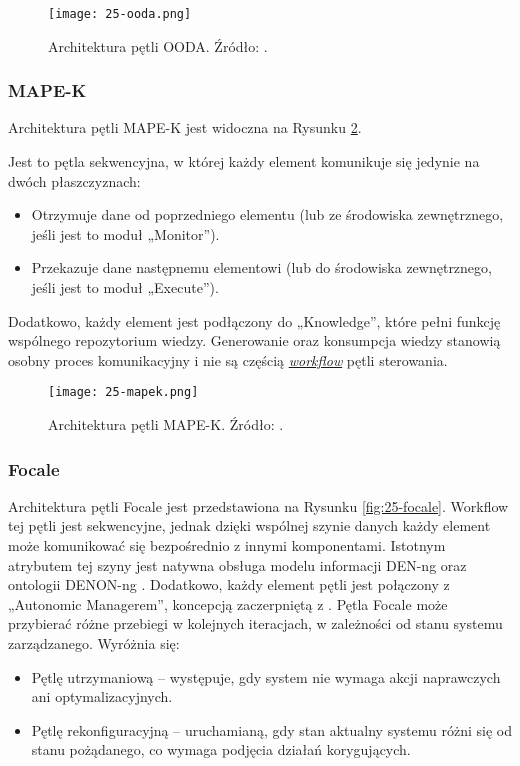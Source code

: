 \begin{figure}[!h]
    \centering \texttt{[image: 25-ooda.png]}
    \caption{Architektura pętli OODA. Źródło: \cite{etsieni2024}.}\label{fig:25-ooda}
\end{figure}

\subsubsection{MAPE-K}
Architektura pętli MAPE-K \cite{kephart2003} jest widoczna na Rysunku \ref{fig:25-mapek}.

Jest to pętla sekwencyjna, w której każdy element komunikuje się jedynie na dwóch płaszczyznach:
\begin{itemize}
    \item Otrzymuje dane od poprzedniego elementu (lub ze środowiska zewnętrznego, jeśli jest to moduł „Monitor”).
    \item Przekazuje dane następnemu elementowi (lub do środowiska zewnętrznego, jeśli jest to moduł „Execute”).
\end{itemize}

Dodatkowo, każdy element jest podłączony do „Knowledge”, które pełni funkcję wspólnego repozytorium wiedzy. Generowanie oraz konsumpcja wiedzy stanowią osobny proces komunikacyjny i nie są częścią \hyperlink{def:workflow}{\textit{workflow}} pętli sterowania.

\begin{figure}[!h]
    \centering \texttt{[image: 25-mapek.png]}
    \caption{Architektura pętli MAPE-K. Źródło: \cite{etsieni2024}.}\label{fig:25-mapek}
\end{figure}

\subsubsection{Focale}

Architektura pętli Focale \cite{strassner2007} jest przedstawiona na Rysunku \ref{fig:25-focale}. Workflow tej pętli jest sekwencyjne, jednak dzięki wspólnej szynie danych każdy element może komunikować się bezpośrednio z innymi komponentami. Istotnym atrybutem tej szyny jest natywna obsługa modelu informacji DEN-ng \cite{strassner2003} oraz ontologii DENON-ng \cite{strassner2007}. Dodatkowo, każdy element pętli jest połączony z „Autonomic Managerem”, koncepcją zaczerpniętą z \cite{kephart2003}. Pętla Focale może przybierać różne przebiegi w kolejnych iteracjach, w zależności od stanu systemu zarządzanego. Wyróżnia się:
\begin{itemize}
    \item Pętlę utrzymaniową – występuje, gdy system nie wymaga akcji naprawczych ani optymalizacyjnych.
    \item Pętlę rekonfiguracyjną – uruchamianą, gdy stan aktualny systemu różni się od stanu pożądanego, co wymaga podjęcia działań korygujących.
\end{itemize}


